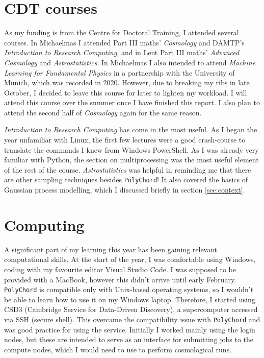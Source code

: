 \documentclass{article}
\begin{document}
\section{CDT courses} 
As my funding is from the Centre for Doctoral Training, I attended several courses. In Michaelmas I attended Part III maths' \textit{Cosmology} and DAMTP's \textit{Introduction to Research Computing}, and in Lent Part III maths' \textit{Advanced Cosmology} and \textit{Astrostatistics}. In Michaelmas I also intended to attend \textit{Machine Learning for Fundamental Physics} in a partnership with the University of Munich, which was recorded in 2020. However, due to breaking my ribs in late October, I decided to leave this course for later to lighten my workload. I will attend this course over the summer once I have finished this report. I also plan to attend the second half of \textit{Cosmology} again for the same reason.

\textit{Introduction to Research Computing} has come in the most useful. As I began the year unfamiliar with Linux, the first few lectures were a good crash-course to translate the commands I knew from Windows PowerShell. As I was already very familiar with Python, the section on multiprocessing was the most useful element of the rest of the course. \textit{Astrostatistics} was helpful in reminding me that there are other sampling techniques besides \texttt{PolyChord}! It also covered the basics of Gaussian process modelling, which I discussed briefly in section \ref{sec:context}.

\newpage

\section{Computing}
A significant part of my learning this year has been gaining relevant computational skills. At the start of the year, I was comfortable using Windows, coding with my favourite editor Visual Studio Code. I was supposed to be provided with a MacBook, however this didn't arrive until early February. \texttt{PolyChord} is compatible only with Unix-based operating systems, so I wouldn't be able to learn how to use it on my Windows laptop. Therefore, I started using CSD3 (Cambridge Service for Data-Driven Discovery), a supercomputer accessed via SSH (secure shell). This overcame the compatibility issue with \texttt{PolyChord} and was good practice for using the service. Initially I worked mainly using the login nodes, but these are intended to serve as an interface for submitting jobs to the compute nodes, which I would need to use to perform cosmological runs.
\end{document}
